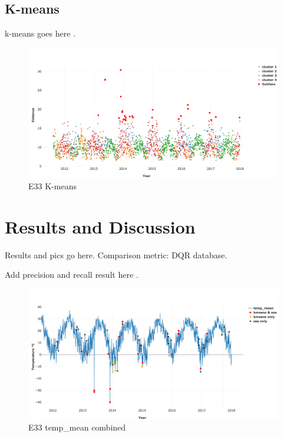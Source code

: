 \documentclass[letterpaper, 10 pt, conference]{ieeeconf}  %
\begin{document}
\subsection{K-means}
k-means goes here \cite{hartigan1979algorithm}.
\begin{figure}[ht]
    \centering
    \includegraphics[width=\textwidth]{kmeans.png}
    \caption{E33 K-means}
    \label{fig:kmeans}
\end{figure}

\section{Results and Discussion}
Results and pics go here. Comparison metric: DQR database. 



Add precision and recall result here \cite{perry1955machine}.
\begin{figure}[ht]
    \centering
    \includegraphics[width=\textwidth]{combined.png}
    \caption{E33 temp\_mean combined}
    \label{fig:combined}
\end{figure}
\end{document}
